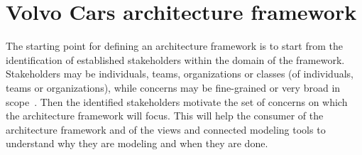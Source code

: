 \section{Volvo Cars architecture framework}\label{sec:VCGAF}

The starting point for defining an architecture framework is to start from the identification of established stakeholders within the domain of the framework. Stakeholders may be individuals, teams,
organizations or classes (of individuals, teams or organizations), while concerns may be fine-grained or very broad in scope~\cite{Emery-Hilliard:2009}. 
Then the identified stakeholders motivate the set of concerns on which the architecture framework will focus.
This will help the consumer of the architecture framework and of the views and connected modeling tools to understand why
they are modeling and when they are done.

